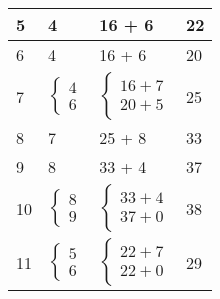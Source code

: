 \documentclass{report}
\begin{document}
\begin{multicols*}{2}
\begin{table}[H]
\begin{center}
\begin{tabular}{|l|l|l|l|}
            5 & 4& 16 + 6 & 22 
            \\ 
            \hline            

            6 & 4 & 16 + 6 & 20 
            \\ 
            \hline           
            7 & \hspace{-1.1em}  
            $\begin{cases}
                4 \\
                6 
            \end{cases}$ 
              & 
              \hspace{-1.1em}
              $\begin{cases}
                  16 + 7 \\ 
                  20 + 5 
              \end{cases}$ 
              & 25
              \\
              \hline            

            8 & 7 & 25 + 8 & 33  
            \\ 

            \hline            

            9 & 8 & 33 + 4 & 37 
            \\ 
            \hline            

            10 & \hspace{-1.1em}
            $\begin{cases}
                8 \\
                9 
            \end{cases}$
               & 
               \hspace{-1.1em}
               $\begin{cases}
                   33 + 4 \\ 
                   37 + 0 
               \end{cases}$ 
               & 38
               \\ 
               \hline  
            11 & \hspace{-1.1em}
            $\begin{cases}
                5 \\
                6 
            \end{cases}$
               & 
               \hspace{-1.1em}
               $\begin{cases}
                   22 + 7 \\ 
                   22 + 0 
               \end{cases}$ 
               & 29
               \\ 


\end{tabular}
\end{center}
\end{table}
\end{multicols*}
\end{document}
